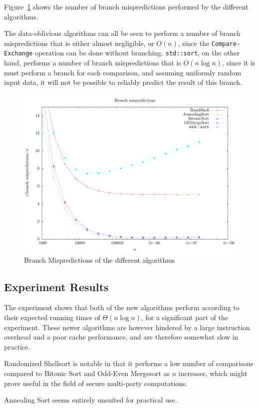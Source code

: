 Figure~\ref{fig:Performance:branchmisses} shows the number of branch mispredictions performed by the different algorithms.

The data-oblivious algorithms can all be seen to perform a number of branch mispredictions that is either almost negligible, or $O (n)$, since the \texttt{Compare-Exchange} operation can be done without branching. \texttt{std::sort}, on the other hand, performs a number of branch mispredictions that is $O(n \log n)$, since it is must perform a branch for each comparison, and assuming uniformly random input data, it will not be possible to reliably predict the result of this branch. 

\begin{figure}
\center
\includegraphics[width=\textwidth]{graphs/Performance/branch-misses.pdf}
\caption{Branch Mispredictions of the different algorithms}
\label{fig:Performance:branchmisses}
\end{figure}

\subsection{Experiment Results}

The experiment shows that both of the new algorithms perform according to their expected running times of $\Theta(n \log n)$, for a significant part of the experiment. These newer algorithms are however hindered by a large instruction overhead and a poor cache performance, and are therefore somewhat slow in practice.

Randomized Shellsort is notable in that it performs a low number of comparisons compared to Bitonic Sort and Odd-Even Mergesort as $n$ increases, which might prove useful in the field of secure multi-party computations.

Annealing Sort seems entirely unsuited for practical use.

